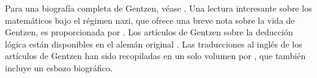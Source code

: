 \documentclass[../../../include/open-logic-section]{subfiles}
\begin{document}
\begin{reading}
Para una biografía completa de Gentzen, véase \citet{Menzler-Trott2007}. Una lectura interesante sobre los matemáticos bajo el régimen nazi, que ofrece una breve nota sobre la vida de Gentzen, es proporcionada por \citet{Segal2014}. Los artículos de Gentzen sobre la deducción lógica están disponibles en el alemán original \citep{Gentzen1935a,Gentzen1935b}. Las traducciones al inglés de los artículos de Gentzen han sido recopiladas en un solo volumen por \citet{Gentzen1969}, que también incluye un esbozo biográfico.
\end{reading}
\end{document}
